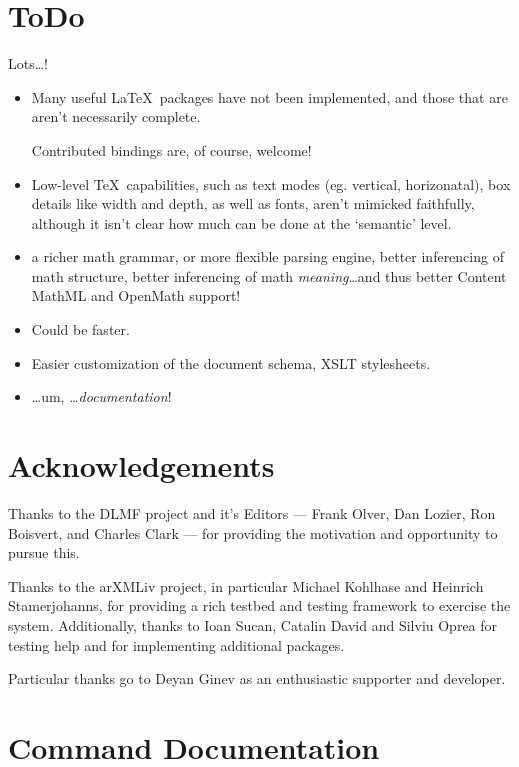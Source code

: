 \documentclass{book}
\begin{document}
\chapter{ToDo}\label{todo}
Lots\ldots!
\begin{itemize}
\item Many useful \LaTeX\ packages have not been implemented, and those
  that are aren't necessarily complete.

  Contributed bindings are, of course, welcome!
\item Low-level \TeX\ capabilities, such as text modes (eg. vertical, horizonatal),
 box details like width and depth, as well as fonts,  aren't mimicked faithfully,
  although it isn't clear how much can be done at the `semantic' level.
\item a richer math grammar, or more flexible parsing engine,
  better inferencing of math structure,
  better inferencing of math \emph{meaning}\ldots and thus better
  Content MathML and OpenMath support!
\item Could be faster.
\item Easier customization of the document schema, XSLT stylesheets.
\item \ldots um, \ldots \emph{documentation}!
\end{itemize}

\chapter*{Acknowledgements}\label{acknowledgements}
Thanks to the DLMF project and it's Editors ---
Frank Olver, Dan Lozier, Ron Boisvert, and Charles Clark ---
for providing the motivation and opportunity to pursue this.

Thanks to the arXMLiv project, in particular Michael Kohlhase and Heinrich Stamerjohanns,
for providing a rich testbed and testing framework to exercise the system.
Additionally, thanks to Ioan Sucan, 
Catalin David and Silviu Oprea for testing help and for implementing additional packages.

Particular thanks go to Deyan Ginev as an enthusiastic supporter and
developer.
\appendix
\chapter[Commands]{Command Documentation}\label{commands}
%
\makeatletter\def\verbatim@font{\small\normalfont\ttfamily}\makeatother



\end{document}
